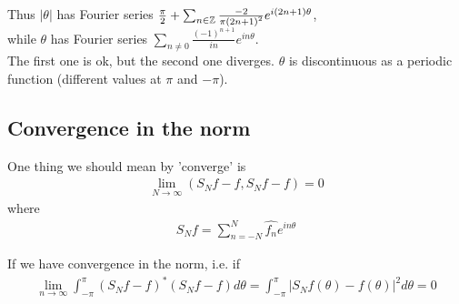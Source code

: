 \documentclass[a4paper]{article}
\begin{document}
Thus $|\theta|$ has Fourier series $\frac{\pi}{2} + \sum_{n\in\mathbb{Z}} \frac{-2}{\pi \left(2n+1\right)^2} e^{i\left(2n+1\right)\theta}$,\\
while $\theta$ has Fourier series $\sum_{n\neq 0} \frac{\left(-1\right)^{n+1}}{in}e^{in\theta}$.\\
The first one is ok, but the second one diverges. $\theta$ is discontinuous as a periodic function (different values at $\pi$ and $-\pi$).

\subsection{Convergence in the norm}
One thing we should mean by 'converge' is
\begin{equation*}
\begin{aligned}
\lim_{N\to\infty} \left(S_N f-f,S_N f-f\right) = 0
\end{aligned}
\end{equation*}
where
\begin{equation*}
\begin{aligned}
S_N f = \sum_{n=-N}^N \hat{f_n} e^{in\theta}
\end{aligned}
\end{equation*}

If we have convergence in the norm, i.e. if
\begin{equation*}
\begin{aligned}
\lim_{n\to \infty} \int_{-\pi}^\pi \left(S_N f-f\right)^* \left(S_N f-f\right) d\theta = \int_{-\pi}^\pi |S_N f\left(\theta\right) - f\left(\theta\right) |^2 d\theta = 0
\end{aligned}
\end{equation*}
\end{document}

